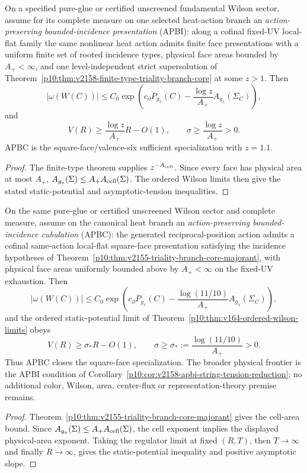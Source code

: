 \documentclass[12pt,a4paper]{article}
\begin{document}
\begin{corollary}
\label{p10:cor:v2158-apbi-string-tension-reduction}
On a specified pure-glue or certified unscreened fundamental Wilson sector,
assume for its complete measure on one selected heat-action branch an
\emph{action-preserving bounded-incidence presentation} (APBI): along a cofinal fixed-UV local-flat
family the same nonlinear heat action admits finite face presentations with a
uniform finite set of rooted incidence types, physical face areas bounded by
$A_+<\infty$, and one level-independent strict supersolution of
Theorem~\ref{p10:thm:v2158-finite-type-triality-branch-core} at some $z>1$.
Then
\[
 |\omega(W(C))|
 \le C_0\exp\!\left(c_\partial P_{g_x}(C)
 -\frac{\log z}{A_+}A_{g_x}(\Sigma_C)\right),
\]
and
\[
 \boxed{
 V(R)\ge \frac{\log z}{A_+}R-O(1),\qquad
 \sigma\ge\frac{\log z}{A_+}>0.}
\]
APBC is the square-face/valence-six sufficient specialization with $z=1.1$.
\end{corollary}
\begin{proof}
The finite-type theorem supplies $z^{-A_{\rm cell}}$.  Since every face has
physical area at most $A_+$,
$A_{g_x}(\Sigma)\le A_+A_{\rm cell}(\Sigma)$.  The ordered Wilson limits then
give the stated static-potential and asymptotic-tension inequalities.
\end{proof}

\begin{corollary}
\label{p10:cor:v2155-apbc-string-tension-reduction}
On the same pure-glue or certified unscreened Wilson sector and complete
measure, assume on the canonical heat branch an \emph{action-preserving bounded-
incidence cubulation} (APBC): the generated reciprocal-position action admits a
cofinal same-action local-flat square-face presentation satisfying the
incidence hypotheses of
Theorem~\ref{p10:thm:v2155-triality-branch-core-majorant}, with physical face
areas uniformly bounded above by \(A_+<\infty\) on the fixed-UV exhaustion.
Then
\[
 |\omega(W(C))|
 \le C_0\exp\!\left(c_\partial P_{g_x}(C)
 -\frac{\log(11/10)}{A_+}A_{g_x}(\Sigma_C)\right),
\]
and the ordered static-potential limit of
Theorem~\ref{p10:thm:v164-ordered-wilson-limits} obeys
\[
 V(R)\ge \sigma_*R-O(1),
 \qquad
 \sigma\ge\sigma_*:=\frac{\log(11/10)}{A_+}>0.
\]
Thus APBC closes the square-face specialization.  The broader physical
frontier is the APBI condition of
Corollary~\ref{p10:cor:v2158-apbi-string-tension-reduction}; no additional
color, Wilson, area, center-flux or representation-theory premise remains.
\end{corollary}
\begin{proof}
Theorem~\ref{p10:thm:v2155-triality-branch-core-majorant} gives the cell-area
bound.  Since \(A_{g_x}(\Sigma)\le A_+A_{\rm cell}(\Sigma)\), the cell exponent
implies the displayed physical-area exponent.  Taking the regulator limit at
fixed \((R,T)\), then \(T\to\infty\) and finally \(R\to\infty\), gives the
static-potential inequality and positive asymptotic slope.
\end{proof}
\end{document}
